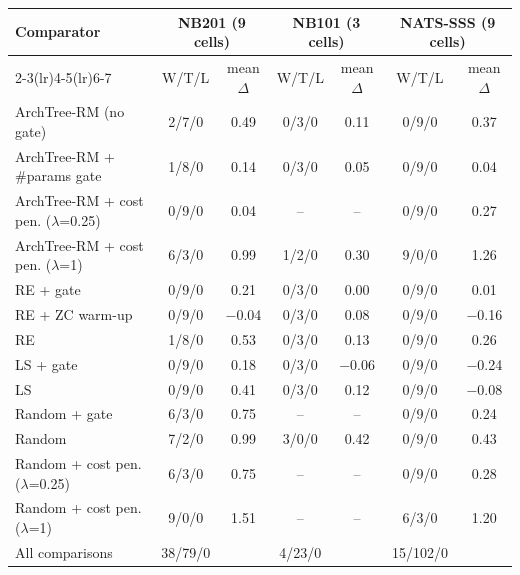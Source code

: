 \begin{tabular}{@{}lcccccc@{}}
\toprule
\multirow{2}{*}{Comparator} & \multicolumn{2}{c}{NB201 (9 cells)} & \multicolumn{2}{c}{NB101 (3 cells)} & \multicolumn{2}{c}{NATS-SSS (9 cells)}\\
\cmidrule(lr){2-3}\cmidrule(lr){4-5}\cmidrule(lr){6-7}
 & W/T/L & mean $\Delta$ & W/T/L & mean $\Delta$ & W/T/L & mean $\Delta$\\
\midrule
ArchTree-RM (no gate) & 2/7/0 & 0.49 & 0/3/0 & 0.11 & 0/9/0 & 0.37\\
ArchTree-RM + \#params gate & 1/8/0 & 0.14 & 0/3/0 & 0.05 & 0/9/0 & 0.04\\
ArchTree-RM + cost pen. ($\lambda$=0.25) & 0/9/0 & 0.04 & -- & -- & 0/9/0 & 0.27\\
ArchTree-RM + cost pen. ($\lambda$=1) & 6/3/0 & 0.99 & 1/2/0 & 0.30 & 9/0/0 & 1.26\\
RE + gate & 0/9/0 & 0.21 & 0/3/0 & 0.00 & 0/9/0 & 0.01\\
RE + ZC warm-up & 0/9/0 & $-$0.04 & 0/3/0 & 0.08 & 0/9/0 & $-$0.16\\
RE & 1/8/0 & 0.53 & 0/3/0 & 0.13 & 0/9/0 & 0.26\\
LS + gate & 0/9/0 & 0.18 & 0/3/0 & $-$0.06 & 0/9/0 & $-$0.24\\
LS & 0/9/0 & 0.41 & 0/3/0 & 0.12 & 0/9/0 & $-$0.08\\
Random + gate & 6/3/0 & 0.75 & -- & -- & 0/9/0 & 0.24\\
Random & 7/2/0 & 0.99 & 3/0/0 & 0.42 & 0/9/0 & 0.43\\
Random + cost pen. ($\lambda$=0.25) & 6/3/0 & 0.75 & -- & -- & 0/9/0 & 0.28\\
Random + cost pen. ($\lambda$=1) & 9/0/0 & 1.51 & -- & -- & 6/3/0 & 1.20\\
\midrule
All comparisons & 38/79/0 & & 4/23/0 & & 15/102/0 & \\
\bottomrule
\end{tabular}
